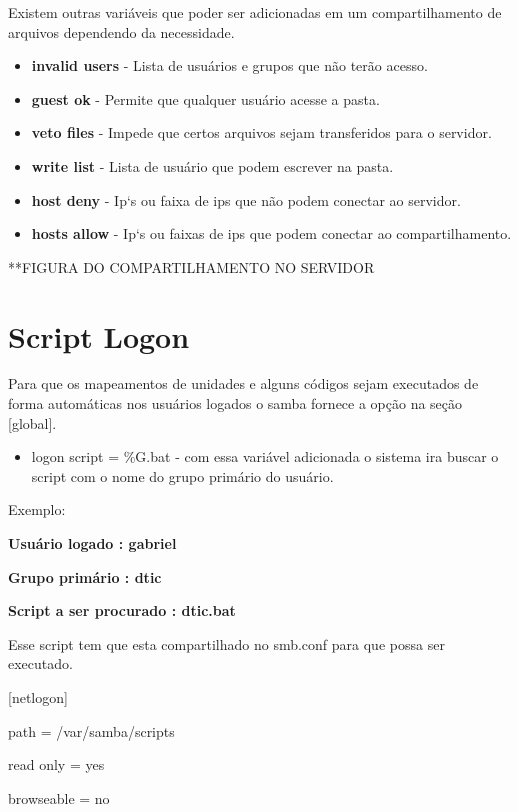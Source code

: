 Existem outras variáveis que poder ser adicionadas em um compartilhamento de arquivos dependendo da necessidade.

\begin{itemize}
	\item \textbf{invalid users} - Lista de usuários e grupos que não terão acesso.
	\item \textbf{guest ok} - Permite que qualquer usuário acesse a pasta.
	\item \textbf{veto files} - Impede que certos arquivos sejam transferidos para o servidor.
	\item \textbf{write list} - Lista de usuário que podem escrever na pasta.
	\item \textbf{host deny} - Ip`s ou faixa de ips que não podem conectar ao servidor.
	\item \textbf{hosts allow} - Ip`s ou faixas de ips que podem conectar ao compartilhamento.
\end{itemize}

**FIGURA DO COMPARTILHAMENTO NO SERVIDOR

\section{Script Logon}

Para que os mapeamentos de unidades e alguns códigos sejam executados de forma automáticas nos usuários logados o samba fornece a opção na seção [global]. 

\begin{itemize}
	\item {logon script = \%G.bat } - com essa variável adicionada o sistema ira buscar o script com o nome do grupo primário do usuário. 
\end{itemize}

Exemplo: 

\textbf{Usuário logado : gabriel}

\textbf{Grupo primário : dtic}

\textbf{Script a ser procurado : dtic.bat}

Esse script tem que esta compartilhado no smb.conf para que possa ser executado. 

	[netlogon] 

		path = /var/samba/scripts 

		read only = yes 

		browseable = no 
		

